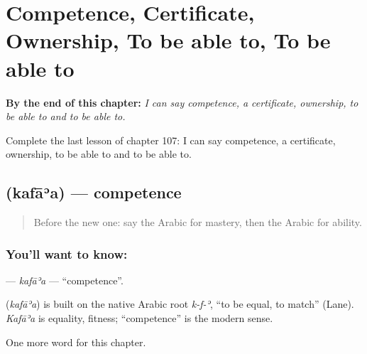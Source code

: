 
\chapter{Competence, Certificate, Ownership, To be able to, To be able to}
\label{ch:ar-competence-certificate-ownership-to-be-able-to-to-be-able-to}

\begin{chapteropening}
\textbf{By the end of this chapter:} \emph{I can say competence, a certificate, ownership, to be able to and to be able to.}

Complete the last lesson of chapter 107: I can say competence, a certificate, ownership, to be able to and to be able to.
\end{chapteropening}

\section[\texorpdfstring{\ar{كفاءة} (kafāʾa)}{كفاءة (kafāʾa)}]{ (kafāʾa) — competence}

\label{lesson:AR-C107-kafaa}



\begin{quote}
Before the new one: say the Arabic for mastery, then the Arabic for ability.
\end{quote}

\subsection*{You'll want to know: }
\textbf{} — \emph{kafāʾa} — \textquotedblleft{}competence\textquotedblright{}.

\begin{cousinweb}
\textbf{} (\emph{kafāʾa}) is built on the native Arabic root \emph{k-f-ʾ}, \textquotedblleft{}to be equal, to match\textquotedblright{} (Lane). \emph{Kafāʾa} is equality, fitness; \textquotedblleft{}competence\textquotedblright{} is the modern sense.
\end{cousinweb}

\begin{grammarlens}[title={What you've built}]
One more word for this chapter.
\end{grammarlens}

